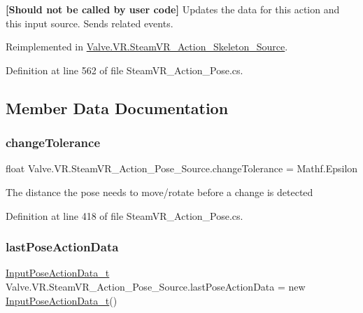 {\bfseries{\mbox{[}Should not be called by user code\mbox{]}}} Updates the data for this action and this input source. Sends related events. 



Reimplemented in \mbox{\hyperlink{class_valve_1_1_v_r_1_1_steam_v_r___action___skeleton___source_a1b70de6042eb094c05dcd7f905ff3abd}{Valve.\+V\+R.\+Steam\+V\+R\+\_\+\+Action\+\_\+\+Skeleton\+\_\+\+Source}}.



Definition at line 562 of file Steam\+V\+R\+\_\+\+Action\+\_\+\+Pose.\+cs.



\subsection{Member Data Documentation}
\mbox{\label{class_valve_1_1_v_r_1_1_steam_v_r___action___pose___source_ac24988086bc9a48b2cd2ba3189795588}} 
\subsubsection{\texorpdfstring{changeTolerance}{changeTolerance}}
{\footnotesize\ttfamily float Valve.\+V\+R.\+Steam\+V\+R\+\_\+\+Action\+\_\+\+Pose\+\_\+\+Source.\+change\+Tolerance = Mathf.\+Epsilon}



The distance the pose needs to move/rotate before a change is detected 



Definition at line 418 of file Steam\+V\+R\+\_\+\+Action\+\_\+\+Pose.\+cs.

\mbox{\label{class_valve_1_1_v_r_1_1_steam_v_r___action___pose___source_a4b4ba298edd6befd45dd711517820e81}} 
\subsubsection{\texorpdfstring{lastPoseActionData}{lastPoseActionData}}
{\footnotesize\ttfamily \mbox{\hyperlink{struct_valve_1_1_v_r_1_1_input_pose_action_data__t}{Input\+Pose\+Action\+Data\+\_\+t}} Valve.\+V\+R.\+Steam\+V\+R\+\_\+\+Action\+\_\+\+Pose\+\_\+\+Source.\+last\+Pose\+Action\+Data = new \mbox{\hyperlink{struct_valve_1_1_v_r_1_1_input_pose_action_data__t}{Input\+Pose\+Action\+Data\+\_\+t}}()\hspace{0.3cm}{\ttfamily [protected]}}



